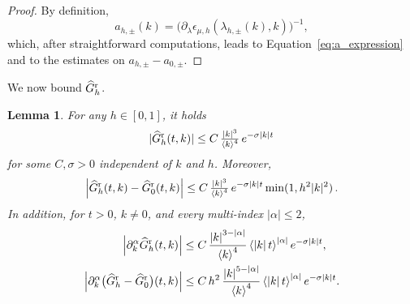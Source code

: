 \documentclass[a4paper,12pt]{amsart} %
\theoremstyle{plain}
\newtheorem{lem}[thm]{Lemma}
\theoremstyle{definition}
\newcommand		{\lt}			{\left}				%
\newcommand		{\rt}			{\right}			%
\renewcommand	{\(}			{\lt(}
\renewcommand	{\)}			{\rt)}
\newcommand		{\bangle}[1]	{\lt\langle #1\rt\rangle}
\newcommand		{\weight}[1]	{\bangle{#1}}	%
\newcommand		{\n}[1]			{\lt\lvert{#1}\rt\rvert}	%
\newcommand		{\sabs}[1]		{\lvert{#1}\rvert}
\newcommand	{\h}			{h}
\newcommand		{\hatG}			{\widehat{G}}
\newcommand		{\hatGr}		{\hatG^{\textnormal{r}}}
\begin{document}
	\begin{proof}
		By definition,
		\begin{equation*}
			a_{\h,\pm}(k) = \bigl( \partial_\lambda \epsilon_{\mu,\h}(\lambda_{\h,\pm}(k),k) \bigr)^{-1},
		\end{equation*}
		which, after straightforward computations, leads to Equation~\eqref{eq:a_expression} and to the estimates on $a_{h,\pm} - a_{0,\pm}$.
	\end{proof}
	
	We now bound $\hatGr_\h$.
	
	\begin{lem}\label{lem:estim_hatGr}
		For any $\h\in[0,1]$, it holds
		\begin{equation}\label{eq:hatGr1}
			\sabs{\hatGr_\h(t,k)} \leq C \, \tfrac{\n{k}^3}{\weight{k}^4} \, e^{-\sigma\n{k}t}
		\end{equation}
		for some $C,\sigma>0$ independent of $k$ and $\h$. Moreover,
		\begin{equation}\label{eq:splitr}
			\n{\hatGr_\h(t,k) - \hatGr_0(t,k)} \le C \, \tfrac{\n{k}^3}{\weight{k}^4} \, e^{-\sigma\n{k}t} \min(1, h^2 |k|^2) \, .
		\end{equation}
		In addition, for $t>0$, $k\neq0$, and every multi-index $\n{\alpha}\leq2$,
		\begin{align}\label{eq:Gr-symbol-derivatives}
			\n{\partial_k^\alpha\hatGr_\h(t,k)}
			&\leq C \, \frac{\n{k}^{3-\n{\alpha}}}{\weight{k}^4}
			\weight{\n{k}t}^{\n{\alpha}}e^{-\sigma\n{k}t},
			\\\label{eq:Gr-difference-symbol-derivatives}
			\n{\partial_k^\alpha
			\bigl(\hatGr_\h-\hatGr_0\bigr)(t,k)}
			&\leq C \, h^2\, \frac{\n{k}^{5-\n{\alpha}}}{\weight{k}^4}
			\weight{\n{k}t}^{\n{\alpha}} e^{-\sigma\n{k}t} .
		\end{align}
	\end{lem}
\end{document}
